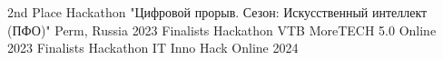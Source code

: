 
\begin{cvhonors}

  \cvhonor
    {2nd Place} %
    {Hackathon "Цифровой прорыв. Сезон: Искусственный интеллект (ПФО)"} %
    {Perm, Russia} %
    {2023} %
  \cvhonor
    {Finalists} %
    {Hackathon VTB MoreTECH 5.0} %
    {Online} %
    {2023} %
  \cvhonor
    {Finalists} %
    {Hackathon IT Inno Hack} %
    {Online} %
    {2024} %
\end{cvhonors}

